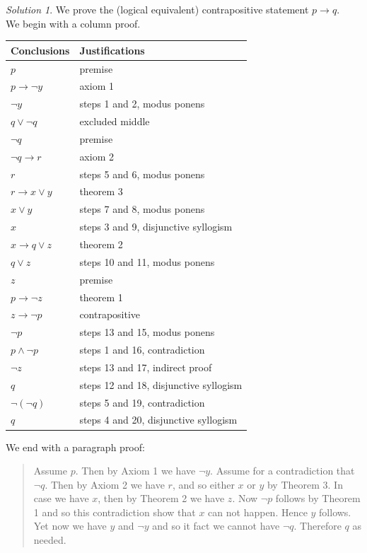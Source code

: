 \documentclass[
  letterpaper,
  10pt,
  reqno,
  twopage,
  openany]{book}
\theoremstyle{plain}
\theoremstyle{definition}
\theoremstyle{definition}
\theoremstyle{definition}
\theoremstyle{plain}
\theoremstyle{plain}
\theoremstyle{remark}
\newtheorem*{solution}{Solution}
\begin{document}
\begin{solution}

We prove the (logical equivalent) contrapositive statement
\(p\rightarrow q\).\\
We begin with a column proof.

\begin{longtable}[]{@{}ll@{}}
\toprule()
Conclusions & Justifications \\
\midrule()
\endhead
\(p\) & premise \\
\(p\rightarrow \neg y\) & axiom 1 \\
\(\neg y\) & steps 1 and 2, modus ponens \\
\(q \lor \neg q\) & excluded middle \\
\(\neg q\) & premise \\
\(\neg q\rightarrow r\) & axiom 2 \\
\(r\) & steps 5 and 6, modus ponens \\
\(r\rightarrow x \lor y\) & theorem 3 \\
\(x \lor y\) & steps 7 and 8, modus ponens \\
\(x\) & steps 3 and 9, disjunctive syllogism \\
\(x\rightarrow q\lor z\) & theorem 2 \\
\(q\lor z\) & steps 10 and 11, modus ponens \\
\(z\) & premise \\
\(p\rightarrow \neg z\) & theorem 1 \\
\(z \rightarrow \neg p\) & contrapositive \\
\(\neg p\) & steps 13 and 15, modus ponens \\
\(p\land \neg p\) & steps 1 and 16, contradiction \\
\(\neg z\) & steps 13 and 17, indirect proof \\
\(q\) & steps 12 and 18, disjunctive syllogism \\
\(\neg (\neg q)\) & steps 5 and 19, contradiction \\
\(q\) & steps 4 and 20, disjunctive syllogism \\
\bottomrule()
\end{longtable}

We end with a paragraph proof:

\begin{quote}
Assume \(p\). Then by Axiom 1 we have \(\neg y\). Assume for a
contradiction that \(\neg q\). Then by Axiom 2 we have \(r\), and so
either \(x\) or \(y\) by Theorem 3. In case we have \(x\), then by
Theorem 2 we have \(z\). Now \(\neg p\) follows by Theorem 1 and so this
contradiction show that \(x\) can not happen. Hence \(y\) follows. Yet
now we have \(y\) and \(\neg y\) and so it fact we cannot have
\(\neg q\). Therefore \(q\) as needed.
\end{quote}

\end{solution}
\end{document}
